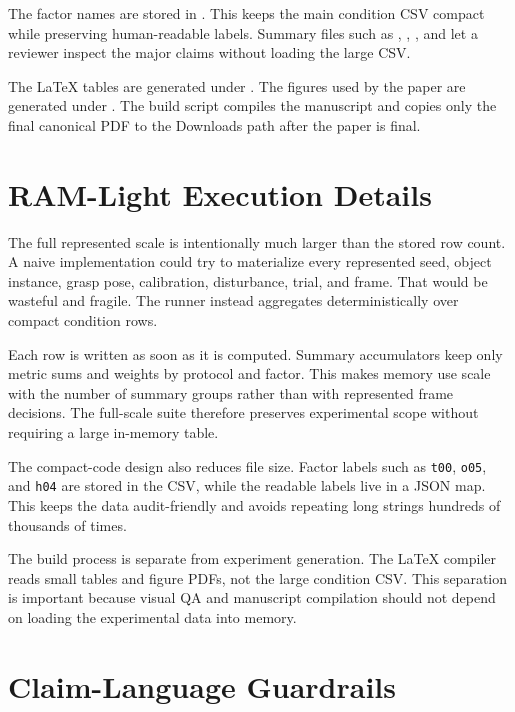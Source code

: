 \documentclass{article}
\begin{document}
The factor names are stored in . This keeps the main condition CSV compact while preserving human-readable labels. Summary files such as , , , and  let a reviewer inspect the major claims without loading the large CSV.

The LaTeX tables are generated under . The figures used by the paper are generated under . The build script compiles the manuscript and copies only the final canonical PDF to the Downloads path after the paper is final.

\section{RAM-Light Execution Details}

The full represented scale is intentionally much larger than the stored row count. A naive implementation could try to materialize every represented seed, object instance, grasp pose, calibration, disturbance, trial, and frame. That would be wasteful and fragile. The runner instead aggregates deterministically over compact condition rows.

Each row is written as soon as it is computed. Summary accumulators keep only metric sums and weights by protocol and factor. This makes memory use scale with the number of summary groups rather than with represented frame decisions. The full-scale suite therefore preserves experimental scope without requiring a large in-memory table.

The compact-code design also reduces file size. Factor labels such as \texttt{t00}, \texttt{o05}, and \texttt{h04} are stored in the CSV, while the readable labels live in a JSON map. This keeps the data audit-friendly and avoids repeating long strings hundreds of thousands of times.

The build process is separate from experiment generation. The LaTeX compiler reads small tables and figure PDFs, not the large condition CSV. This separation is important because visual QA and manuscript compilation should not depend on loading the experimental data into memory.

\section{Claim-Language Guardrails}
\end{document}
